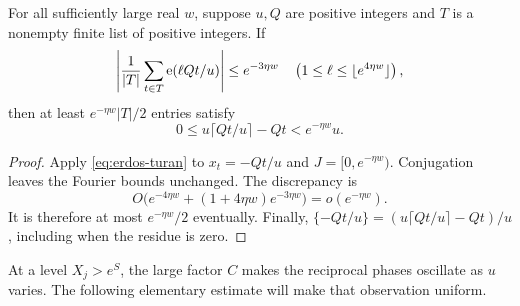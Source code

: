 \begin{lemma}\label{lem:discrepancy}
For all sufficiently large real \(w\), suppose \(u,Q\) are positive
integers and \(T\) is a nonempty finite list of positive integers.
If
\[
 \left|\frac1{|T|}\sum_{t\in T}\mathrm e(\ell Qt/u)\right|
 \le e^{-3\eta w}
 \quad
 \left(1\le\ell\le\lfloor e^{4\eta w}\rfloor\right),
\]
then at least \(e^{-\eta w}|T|/2\) entries satisfy
\[
 0\le u\lceil Qt/u\rceil-Qt<e^{-\eta w}u.
\]
\end{lemma}
\begin{proof}
Apply \eqref{eq:erdos-turan} to \(x_t=-Qt/u\) and
\(J=[0,e^{-\eta w})\).  Conjugation leaves the Fourier bounds
unchanged.  The discrepancy is
\[
 O\bigl(e^{-4\eta w}+(1+4\eta w)e^{-3\eta w}\bigr)
 =o(e^{-\eta w}).
\]
It is therefore at most \(e^{-\eta w}/2\) eventually.
Finally,
\(\{-Qt/u\}=(u\lceil Qt/u\rceil-Qt)/u\), including when the
residue is zero.
\end{proof}

At a level \(X_j>e^S\), the large factor \(C\) makes the reciprocal
phases oscillate as \(u\) varies.  The following elementary estimate
will make that observation uniform.

